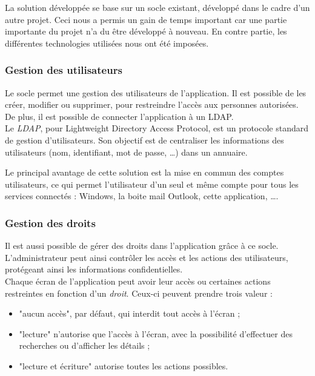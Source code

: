 La solution développée se base sur un socle existant, développé dans le cadre d'un autre projet. Ceci nous a permis un gain de temps important car une partie importante du projet n'a du être développé à nouveau. En contre partie, les différentes technologies utilisées nous ont été imposées.


\subsubsection{Gestion des utilisateurs}

Le socle permet une gestion des utilisateurs de l'application. Il est possible de les créer, modifier ou supprimer, pour restreindre l'accès aux personnes autorisées. De plus, il est possible de connecter l'application à un LDAP.
\\

Le \textit{LDAP}, pour Lightweight Directory Access Protocol, est un protocole standard de gestion d'utilisateurs. Son objectif est de centraliser les informations des utilisateurs (nom, identifiant, mot de passe, \ldots) dans un annuaire.

Le principal avantage de cette solution est la mise en commun des comptes utilisateurs, ce qui permet l'utilisateur d'un seul et même compte pour tous les services connectés : Windows, la boite mail Outlook, cette application, \ldots.


\subsubsection{Gestion des droits}

Il est aussi possible de gérer des droits dans l'application grâce à ce socle. L'administrateur peut ainsi contrôler les accès et les actions des utilisateurs, protégeant ainsi les informations confidentielles.
\\

Chaque écran de l'application peut avoir leur accès ou certaines actions restreintes en fonction d'un \textit{droit}. Ceux-ci peuvent prendre trois valeur : 
\begin{itemize}
	\item "aucun accès", par défaut, qui interdit tout accès à l'écran ;
	\item "lecture" n'autorise que l'accès à l'écran, avec la possibilité d'effectuer des recherches ou d'afficher les détails ;
	\item "lecture et écriture" autorise toutes les actions possibles.
\end{itemize}


